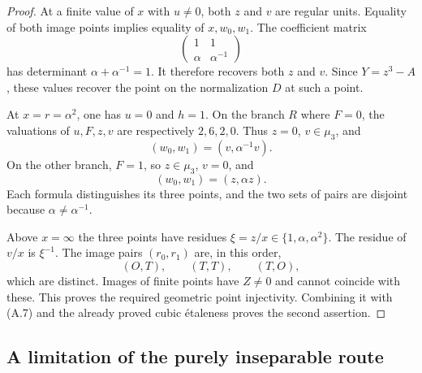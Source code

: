 \begin{proof}
At a finite value of $x$ with $u\ne0$, both $z$ and $v$ are
regular units. Equality of both image points implies equality
of $x,w_0,w_1$. The coefficient matrix
\[
 \begin{pmatrix}1&1\\ \alpha&\alpha^{-1}\end{pmatrix}
\]
has determinant $\alpha+\alpha^{-1}=1$. It therefore recovers
both $z$ and $v$. Since $Y=z^3-A$, these values recover the
point on the normalization $D$ at such a point.

At $x=r=\alpha^2$, one has $u=0$ and $h=1$. On the branch
$R$ where $F=0$, the valuations of $u,F,z,v$ are respectively
$2,6,2,0$. Thus $z=0$, $v\in\mu_3$, and
\[
 (w_0,w_1)=(v,\alpha^{-1}v).
\]
On the other branch, $F=1$, so $z\in\mu_3$, $v=0$, and
\[
 (w_0,w_1)=(z,\alpha z).
\]
Each formula distinguishes its three points, and the two sets
of pairs are disjoint because $\alpha\ne\alpha^{-1}$.

Above $x=\infty$ the three points have residues
$\xi=z/x\in\{1,\alpha,\alpha^2\}$. The residue of $v/x$ is
$\xi^{-1}$. The image pairs $(r_0,r_1)$ are, in this order,
\[
 (O,T),\qquad(T,T),\qquad(T,O),
\]
which are distinct. Images of finite points have $Z\ne0$ and
cannot coincide with these. This proves the required geometric
point injectivity. Combining it with (A.7) and the already
proved cubic \'etaleness proves the second assertion.
\end{proof}

\subsection{A limitation of the purely inseparable route}

